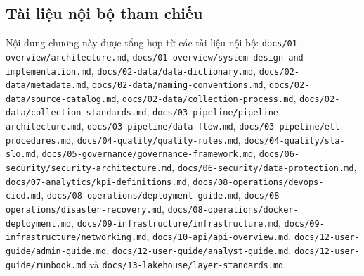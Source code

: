 \documentclass[12pt,a4paper]{article}
\begin{document}
\subsection*{Tài liệu nội bộ tham chiếu}

Nội dung chương này được tổng hợp từ các tài liệu nội bộ: \texttt{docs/01-overview/architecture.md}, \texttt{docs/01-overview/system-design-and-implementation.md}, \texttt{docs/02-data/data-dictionary.md}, \texttt{docs/02-data/metadata.md}, \texttt{docs/02-data/naming-conventions.md}, \texttt{docs/02-data/source-catalog.md}, \texttt{docs/02-data/collection-process.md}, \texttt{docs/02-data/collection-standards.md}, \texttt{docs/03-pipeline/pipeline-architecture.md}, \texttt{docs/03-pipeline/data-flow.md}, \texttt{docs/03-pipeline/etl-procedures.md}, \texttt{docs/04-quality/quality-rules.md}, \texttt{docs/04-quality/sla-slo.md}, \texttt{docs/05-governance/governance-framework.md}, \texttt{docs/06-security/security-architecture.md}, \texttt{docs/06-security/data-protection.md}, \texttt{docs/07-analytics/kpi-definitions.md}, \texttt{docs/08-operations/devops-cicd.md}, \texttt{docs/08-operations/deployment-guide.md}, \texttt{docs/08-operations/disaster-recovery.md}, \texttt{docs/08-operations/docker-deployment.md}, \texttt{docs/09-infrastructure/infrastructure.md}, \texttt{docs/09-infrastructure/networking.md}, \texttt{docs/10-api/api-overview.md}, \texttt{docs/12-user-guide/admin-guide.md}, \texttt{docs/12-user-guide/analyst-guide.md}, \texttt{docs/12-user-guide/runbook.md} và \texttt{docs/13-lakehouse/layer-standards.md}.
\end{document}
